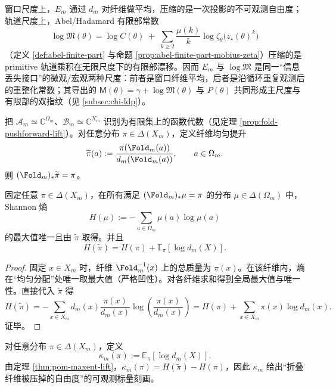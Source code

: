 \begin{remark}[纤维平均与有限部常数的同一接口]\label{rem:pom-em-logm}
窗口尺度上，$E_m$ 通过 $d_m$ 对纤维做平均，压缩的是一次投影的不可观测自由度；轨道尺度上，Abel/Hadamard 有限部常数
\[
\log\mathfrak{M}(\theta)
=
\log C(\theta)
\;+\;
\sum_{k\ge 2}\frac{\mu(k)}{k}\log\zeta_\theta\!\bigl(z_\star(\theta)^k\bigr)
\]
（定义 \ref{def:abel-finite-part} 与命题 \ref{prop:abel-finite-part-mobius-zeta}）压缩的是 primitive 轨道乘积在无限尺度下的有限部漂移。因而 $E_m$ 与 $\log\mathfrak{M}$ 是同一“信息丢失接口”的微观/宏观两种尺度：前者是窗口纤维平均，后者是沿循环重复观测后的重整化常数；其导出的 $\mathsf{M}(\theta)=\gamma+\log\mathfrak{M}(\theta)$ 与 $P(\theta)$ 共同形成主尺度与有限部的双指纹（见 \ref{subsec:chi-ldp}）。
\end{remark}

\begin{definition}[推前与纤维均匀提升]\label{def:pom-maxent-lift}
把 $\mathcal{A}_m\simeq\mathbb{C}^{\Omega_m}$、$\mathcal{B}_m\simeq\mathbb{C}^{X_m}$ 识别为有限集上的函数代数（见定理 \ref{prop:fold-pushforward-lift}）。对任意分布 $\pi\in\Delta(X_m)$，定义纤维均匀提升
\[
\widetilde\pi(a):=\frac{\pi(\Fold_m(a))}{d_m(\Fold_m(a))},\qquad a\in\Omega_m.
\]
则 $(\Fold_m)_*\widetilde\pi=\pi$。
\end{definition}

\begin{theorem}[最大熵提升的唯一性]\label{thm:pom-maxent-lift}
固定任意 $\pi\in\Delta(X_m)$，在所有满足 $(\Fold_m)_*\mu=\pi$ 的分布 $\mu\in\Delta(\Omega_m)$ 中，Shannon 熵
\[
H(\mu):=-\sum_{a\in\Omega_m}\mu(a)\log\mu(a)
\]
的最大值唯一且由 $\widetilde\pi$ 取得。并且
\[
H(\widetilde\pi)=H(\pi)+\mathbb{E}_{\pi}[\log d_m(X)].
\]
\end{theorem}
\begin{proof}
固定 $x\in X_m$ 时，纤维 $\Fold_m^{-1}(x)$ 上的总质量为 $\pi(x)$。在该纤维内，熵在“均匀分配”处唯一取最大值（严格凹性）。对各纤维求和得到全局最大值与唯一性。直接代入 $\widetilde\pi$ 得
\[
H(\widetilde\pi)
=-\sum_{x\in X_m}d_m(x)\frac{\pi(x)}{d_m(x)}\log\!\left(\frac{\pi(x)}{d_m(x)}\right)
=H(\pi)+\sum_{x\in X_m}\pi(x)\log d_m(x).
\]
证毕。
\end{proof}

\begin{definition}[热力学缺陷与空间投影标量]\label{def:pom-kappa}
对任意分布 $\pi\in\Delta(X_m)$，定义
\[
\kappa_m(\pi):=\mathbb{E}_{\pi}[\log d_m(X)].
\]
由定理 \ref{thm:pom-maxent-lift}，$\kappa_m(\pi)=H(\widetilde\pi)-H(\pi)$，因此 $\kappa_m$ 给出“折叠纤维被压掉的自由度”的可观测标量刻画。
\end{definition}

